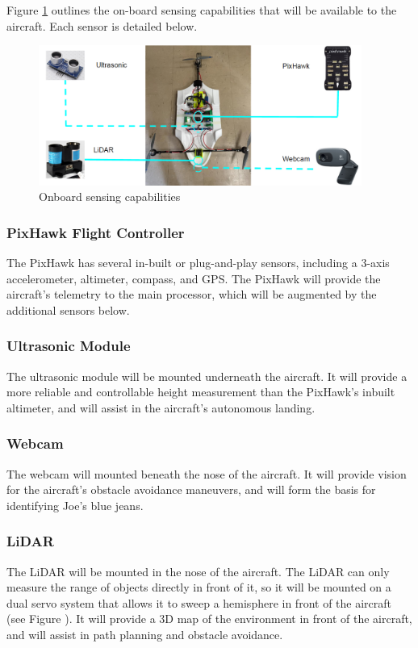 Figure \ref{fig:sensing} outlines the on-board sensing capabilities that will be available to the aircraft. Each sensor is detailed below.

\begin{figure}[!h]
	\centering
	\includegraphics[width=300pt]{Images/sensors}
	\caption{Onboard sensing capabilities}
	\label{fig:sensing}
\end{figure}

\subsubsection*{PixHawk Flight Controller}
The PixHawk has several in-built or plug-and-play sensors, including a 3-axis accelerometer, altimeter, compass, and GPS. The PixHawk will provide the aircraft's telemetry to the main processor, which will be augmented by the additional sensors below.

\subsubsection*{Ultrasonic Module}
The ultrasonic module will be mounted underneath the aircraft. It will provide a more reliable and controllable height measurement than the PixHawk's inbuilt altimeter, and will assist in the aircraft's autonomous landing.

\subsubsection*{Webcam}
The webcam will mounted beneath the nose of the aircraft. It will provide vision for the aircraft's obstacle avoidance maneuvers, and will form the basis for identifying Joe's blue jeans.

\subsubsection*{LiDAR}
The LiDAR will be mounted in the nose of the aircraft. The LiDAR can only measure the range of objects directly in front of it, so it will be mounted on a dual servo system that allows it to sweep a hemisphere in front of the aircraft (see Figure ). It will provide a 3D map of the environment in front of the aircraft, and will assist in path planning and obstacle avoidance.